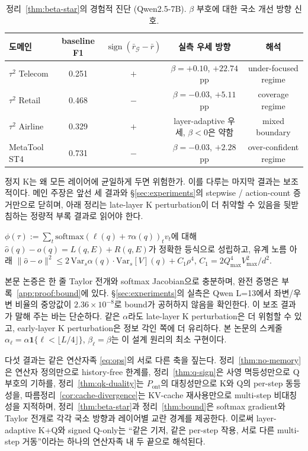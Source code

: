 \begin{table}[h]
\centering
\caption{정리~\ref{thm:beta-star}의 경험적 진단 (Qwen2.5-7B). $\beta$ 부호에 대한 국소 개선 방향 신호.}
\label{tab:sign-routing}
\small
\begin{tabularx}{\linewidth}{@{}Xcccc@{}}
\toprule
도메인 & baseline F1 & $\operatorname{sign}(\bar r_{\mathcal{G}} - \bar r)$ & 실측 우세 방향 & 해석 \\
\midrule
$\tau^2$ Telecom & 0.251 & $+$ & $\beta=+0.10$, $+22.74$pp & under-focused regime \\
$\tau^2$ Retail & 0.468 & $-$ & $\beta=-0.03$, $+5.11$pp & coverage regime \\
$\tau^2$ Airline & 0.329 & $+$ & layer-adaptive 우세, $\beta<0$은 약함 & mixed boundary \\
MetaTool ST4 & 0.731 & $-$ & $\beta=-0.03$, $+2.28$pp & over-confident regime \\
\bottomrule
\end{tabularx}
\end{table}

정지 K는 왜 모든 레이어에 균일하게 두면 위험한가. 이를 다루는 마지막 결과는 보조적이다. 메인 주장은 앞선 세 결과와 \S\ref{sec:experiments}의 stepwise / action-count 증거만으로 닫히며, 아래 정리는 late-layer K perturbation이 더 취약할 수 있음을 뒷받침하는 정량적 부록 결과로 읽어야 한다.

\begin{theorem}\label{thm:bound}
$\phi(\tau) := \sum_t \mathrm{softmax}(\ell(q)+\tau\alpha(q))_t v_t$에 대해 $\hat o(q) - o(q) = L(q, E) + R(q, E)$가 정확한 등식으로 성립하고, 유계 노름 아래
$\|\hat o - o\|^2 \le 2\,\mathrm{Var}_s\alpha(q)\cdot\mathrm{Var}_s[V](q) + C_1 \rho^4$, $C_1 = 2 Q_{\max}^4 V_{\max}^2/d^2$.
\end{theorem}

본문 논증은 한 줄 Taylor 전개와 softmax Jacobian으로 충분하며, 완전 증명은 부록~\ref{app:proof:bound}에 있다. \S\ref{sec:experiments}의 실측은 Qwen L=13에서 좌변/우변 비율의 중앙값이 $2.36\times 10^{-8}$로 bound가 공허하지 않음을 확인한다. 이 보조 결과가 말해 주는 바는 단순하다. 같은 $\alpha$라도 late-layer K perturbation은 더 위험할 수 있고, early-layer K perturbation은 정보 각인 쪽에 더 유리하다. 본 논문의 스케줄 $\alpha_\ell = \alpha \mathbf{1}\{\ell<\lfloor L/4\rfloor\}$, $\beta_\ell = \beta$는 이 설계 원리의 최소 구현이다.

다섯 결과는 같은 연산자족 \eqref{eq:ops}의 서로 다른 축을 짚는다. 정리~\ref{thm:no-memory}은 연산자 정의만으로 history-free 한계를, 정리~\ref{thm:q-sign}은 사영 멱등성만으로 Q 부호의 기하를, 정리~\ref{thm:qk-duality}는 $P_{\mathrm{ont}}$의 대칭성만으로 K와 Q의 per-step 동등성을, 따름정리~\ref{cor:cache-divergence}는 KV-cache 재사용만으로 multi-step 비대칭성을 지적하며, 정리~\ref{thm:beta-star}과 정리~\ref{thm:bound}은 softmax gradient와 Taylor 전개로 각각 국소 방향과 레이어별 교란 경계를 제공한다. 이로써 layer-adaptive K+Q와 signed Q-only는 ``같은 기저, 같은 per-step 작용, 서로 다른 multi-step 거동''이라는 하나의 연산자족 내 두 끝으로 해석된다.
